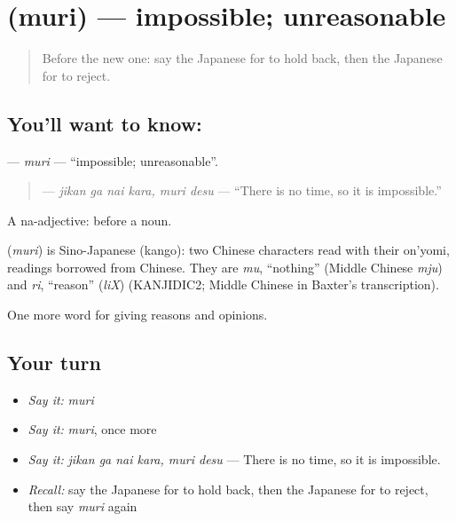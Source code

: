 \section[\texorpdfstring{\ja{むり} (muri)}{むり (muri)}]{ (muri) — impossible; unreasonable}

\label{lesson:JA-C323-muri}



\begin{quote}
Before the new one: say the Japanese for to hold back, then the Japanese for to reject.
\end{quote}

\subsection*{You'll want to know: }
\textbf{} — \emph{muri} — \textquotedblleft{}impossible; unreasonable\textquotedblright{}.

\begin{quote}
\textbf{ } — \emph{jikan ga nai kara, muri desu} — \textquotedblleft{}There is no time, so it is impossible.\textquotedblright{}
\end{quote}

A na-adjective:  before a noun.

\begin{cousinweb}
\textbf{} (\emph{muri}) is Sino-Japanese (kango): two Chinese characters read with their on'yomi, readings borrowed from Chinese. They are \emph{mu}, \textquotedblleft{}nothing\textquotedblright{} (Middle Chinese \emph{mju}) and \emph{ri}, \textquotedblleft{}reason\textquotedblright{} (\emph{liX}) (KANJIDIC2; Middle Chinese in Baxter's transcription).
\end{cousinweb}

\begin{grammarlens}[title={What you've built}]
One more word for giving reasons and opinions.
\end{grammarlens}

\subsection*{Your turn}
\begin{itemize}
\raggedright
  \item \emph{Say it:} \emph{muri}
  \item \emph{Say it:} \emph{muri}, once more
  \item \emph{Say it:} \emph{jikan ga nai kara, muri desu} — There is no time, so it is impossible.
  \item \emph{Recall:} say the Japanese for to hold back, then the Japanese for to reject, then say \emph{muri} again
\end{itemize}

